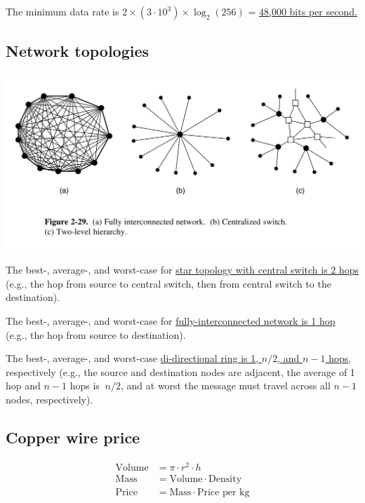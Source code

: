 The minimum data rate is $2 \times (3 \cdot 10^3) \times \log_2(256)$ = \ul{48,000 bits per second.}


\subsection{Network topologies}

\includegraphics[width=\the\columnwidth]{network-topologies.png}

The best-, average-, and worst-case for \ul{star topology with central switch is 2 hops} (e.g., the hop from source to central switch, then from central switch to the destination).

The best-, average-, and worst-case for \ul{fully-interconnected network is 1 hop} (e.g., the hop from source to destination).

The best-, average-, and worst-case \ul{di-directional ring is 1, $n / 2$, and $n - 1$ hops}, respectively (e.g., the source and destination nodes are adjacent, the average of 1 hop and $n - 1$ hops is $~ n/2$, and at worst the message must travel across all $n - 1$ nodes, respectively).

\subsection{Copper wire price}
\begin{align*}
	\text{Volume} &= \pi \cdot r^2 \cdot h \\
	\text{Mass} &= \text{Volume} \cdot \text{Density} \\
	\text{Price} &= \text{Mass} \cdot \text{Price per kg}
\end{align*}

